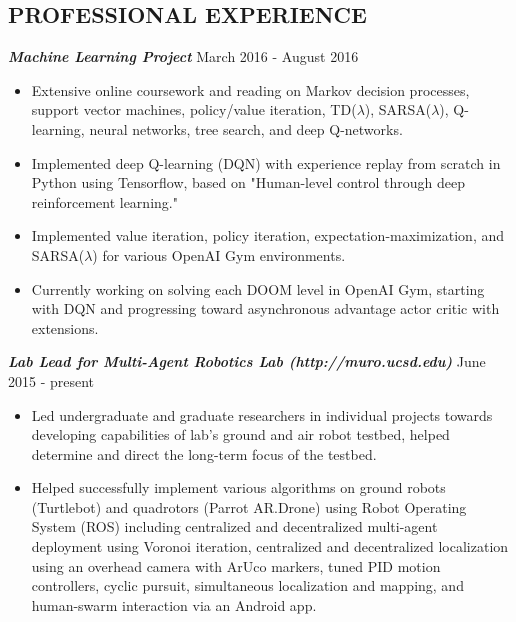 \documentclass{res}
\begin{document}
\begin{resume}
\section{PROFESSIONAL EXPERIENCE}
\vspace{1ex}
{\sl \bf Machine Learning Project} \hfill March 2016 - August 2016 
\vspace*{.5ex}
\begin{itemize}
\item Extensive online coursework and reading on Markov decision processes, support vector machines, policy/value iteration, TD($\lambda$), SARSA($\lambda$), Q-learning, neural networks, tree search, and deep Q-networks.
\vspace*{-.5ex}
\item Implemented deep Q-learning (DQN) with experience replay from scratch in Python using Tensorflow, based on "Human-level control through deep reinforcement learning."
\vspace*{-.5ex}
\item Implemented value iteration, policy iteration, expectation-maximization, and SARSA($\lambda$) for various OpenAI Gym environments. 
\vspace*{-.5ex}
\item Currently working on solving each DOOM level in OpenAI Gym, starting with DQN and progressing toward asynchronous advantage actor critic with extensions.
\end{itemize}
\vspace*{-1ex}
{\sl \bf Lab Lead for Multi-Agent Robotics Lab (http://muro.ucsd.edu)} \hfill June 2015 - present 
\vspace*{.5ex}
\begin{itemize}
\item Led undergraduate and graduate researchers in individual projects towards developing capabilities of lab's ground and air robot testbed, helped determine and direct the long-term focus of the testbed. 
\vspace*{-.5ex}
\item Helped successfully implement various algorithms on ground robots (Turtlebot) and quadrotors (Parrot AR.Drone) using Robot Operating System (ROS) including centralized and decentralized multi-agent deployment using Voronoi iteration, centralized and decentralized localization using an overhead camera with ArUco markers, tuned PID motion controllers, cyclic pursuit, simultaneous localization and mapping, and human-swarm interaction via an Android app.
\vspace*{-.5ex}

\end{itemize}
\end{resume}
\end{document}
